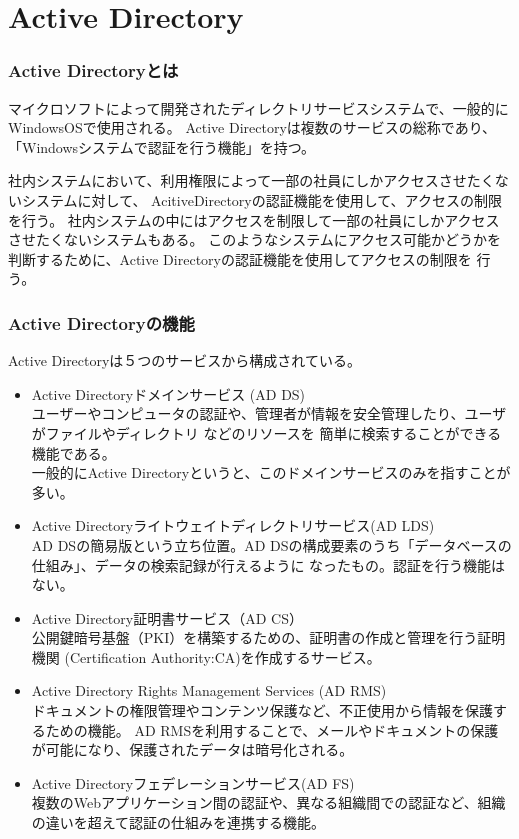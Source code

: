\documentclass[11pt,a4j,titlepage]{jreport}
\begin{document}
\section{Active Directory}\label{Active Directory}
\subsubsection*{Active Directoryとは}
マイクロソフトによって開発されたディレクトリサービスシステムで、一般的にWindowsOSで使用される。
Active Directoryは複数のサービスの総称であり、「Windowsシステムで認証を行う機能」を持つ。

社内システムにおいて、利用権限によって一部の社員にしかアクセスさせたくないシステムに対して、
AcitiveDirectoryの認証機能を使用して、アクセスの制限を行う。
社内システムの中にはアクセスを制限して一部の社員にしかアクセスさせたくないシステムもある。
このようなシステムにアクセス可能かどうかを判断するために、Active Directoryの認証機能を使用してアクセスの制限を
行う。
\fi
\subsubsection*{Active Directoryの機能}

Active Directoryは５つのサービスから構成されている。

\begin{itemize}

    \item  Active Directoryドメインサービス (AD DS)\mbox{}\\
    ユーザーやコンピュータの認証や、管理者が情報を安全管理したり、ユーザがファイルやディレクトリ などのリソースを
    簡単に検索することができる機能である。\\
    一般的にActive Directoryというと、このドメインサービスのみを指すことが多い。
    
    \item Active Directoryライトウェイトディレクトリサービス(AD LDS)\mbox{}\\
    AD DSの簡易版という立ち位置。AD DSの構成要素のうち「データベースの仕組み」、データの検索記録が行えるように
    なったもの。認証を行う機能はない。

    \item Active Directory証明書サービス（AD CS）\mbox{}\\
    公開鍵暗号基盤（PKI）を構築するための、証明書の作成と管理を行う証明機関 (Certification Authority:CA)を作成するサービス。
    
    \item Active Directory Rights Management Services (AD RMS)\mbox{}\\
    ドキュメントの権限管理やコンテンツ保護など、不正使用から情報を保護するための機能。
    AD RMSを利用することで、メールやドキュメントの保護が可能になり、保護されたデータは暗号化される。

    \item Active Directoryフェデレーションサービス(AD FS)\mbox{}\\
    複数のWebアプリケーション間の認証や、異なる組織間での認証など、組織の違いを超えて認証の仕組みを連携する機能。

\end{itemize}
\end{document}
